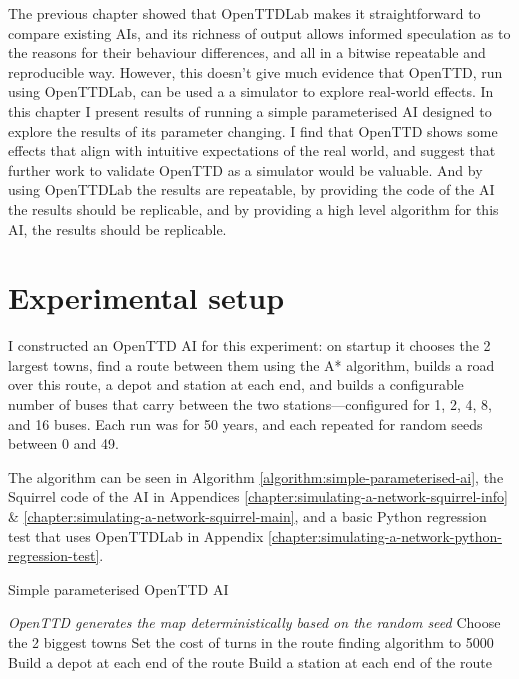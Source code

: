 \documentclass[logo,msc,dsti]{style/infthesis}    %
\begin{document}
{The previous chapter showed that OpenTTDLab makes it straightforward to compare existing AIs, and its richness of output allows informed speculation as to the reasons for their behaviour differences, and all in a bitwise repeatable and reproducible way. However, this doesn't give much evidence that OpenTTD, run using OpenTTDLab, can be used a a simulator to explore real-world effects. In this chapter I present results of running a simple parameterised AI designed to explore the results of its parameter changing. I find that OpenTTD shows some effects that align with intuitive expectations of the real world, and suggest that further work to validate OpenTTD as a simulator would be valuable. And by using OpenTTDLab the results are repeatable, by providing the code of the AI the results should be replicable, and by providing a high level algorithm for this AI, the results should be replicable.

\section{Experimental setup}

I constructed an OpenTTD AI for this experiment: on startup it chooses the 2 largest towns, find a route between them using the A* algorithm, builds a road over this route, a depot and station at each end, and builds a configurable number of buses that carry between the two stations---configured for 1, 2, 4, 8, and 16 buses. Each run was for 50 years, and each repeated for random seeds between 0 and 49.

The algorithm can be seen in Algorithm \ref{algorithm:simple-parameterised-ai}, the Squirrel code of the AI in Appendices \ref{chapter:simulating-a-network-squirrel-info} \& \ref{chapter:simulating-a-network-squirrel-main}, and a basic Python regression test that uses OpenTTDLab in Appendix \ref{chapter:simulating-a-network-python-regression-test}.

\begin{algorithm}
\caption{Simple parameterised OpenTTD AI}
\label{algorithm:simple-parameterised-ai}
 \emph{OpenTTD generates the map deterministically based on the random seed} \;
 Choose the 2 biggest towns \;
 Set the cost of turns in the route finding algorithm to 5000 \;
 Build a depot at each end of the route\;
 Build a station at each end of the route\;
\end{algorithm}

}
\end{document}
